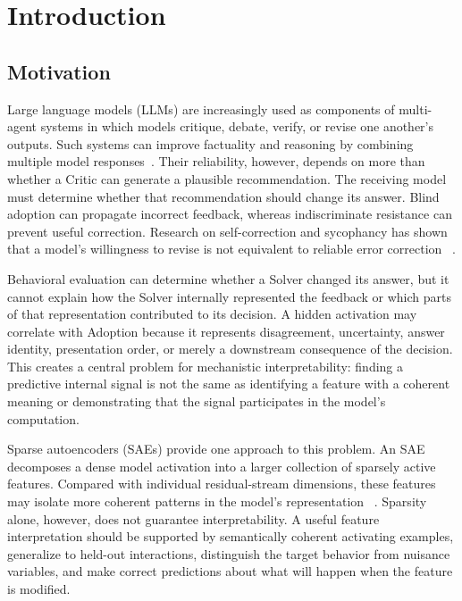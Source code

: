 \chapter{Introduction}
\label{chap:introduction}

\section{Motivation}

Large language models (LLMs) are increasingly used as components of
multi-agent systems in which models critique, debate, verify, or revise one
another's outputs. Such systems can improve factuality and reasoning by
combining multiple model responses~\cite{du2024debate}. Their reliability,
however, depends on more than whether a Critic can generate a plausible
recommendation. The receiving model must determine whether that recommendation
should change its answer. Blind adoption can propagate incorrect feedback,
whereas indiscriminate resistance can prevent useful correction. Research on
self-correction and sycophancy has shown that a model's willingness to revise
is not equivalent to reliable error correction
~\cite{huang2024selfcorrect,sharma2024sycophancy}.

Behavioral evaluation can determine whether a Solver changed its answer, but
it cannot explain how the Solver internally represented the feedback or which
parts of that representation contributed to its decision. A hidden activation
may correlate with Adoption because it represents disagreement, uncertainty,
answer identity, presentation order, or merely a downstream consequence of
the decision. This creates a central problem for mechanistic interpretability:
finding a predictive internal signal is not the same as identifying a feature
with a coherent meaning or demonstrating that the signal participates in the
model's computation.

Sparse autoencoders (SAEs) provide one approach to this problem. An SAE
decomposes a dense model activation into a larger collection of sparsely active
features. Compared with individual residual-stream dimensions, these features
may isolate more coherent patterns in the model's representation
~\cite{cunningham2023sparse,gao2025scaling}. Sparsity alone, however, does not
guarantee interpretability. A useful feature interpretation should be
supported by semantically coherent activating examples, generalize to held-out
interactions, distinguish the target behavior from nuisance variables, and
make correct predictions about what will happen when the feature is modified.

